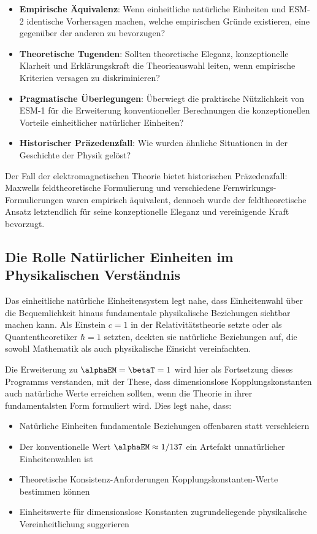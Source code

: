 	\begin{itemize}
		\item \textbf{Empirische Äquivalenz}: Wenn einheitliche natürliche Einheiten und ESM-2 identische Vorhersagen machen, welche empirischen Gründe existieren, eine gegenüber der anderen zu bevorzugen?
		\item \textbf{Theoretische Tugenden}: Sollten theoretische Eleganz, konzeptionelle Klarheit und Erklärungskraft die Theorieauswahl leiten, wenn empirische Kriterien versagen zu diskriminieren?
		\item \textbf{Pragmatische Überlegungen}: Überwiegt die praktische Nützlichkeit von ESM-1 für die Erweiterung konventioneller Berechnungen die konzeptionellen Vorteile einheitlicher natürlicher Einheiten?
		\item \textbf{Historischer Präzedenzfall}: Wie wurden ähnliche Situationen in der Geschichte der Physik gelöst?
	\end{itemize}
	
	Der Fall der elektromagnetischen Theorie bietet historischen Präzedenzfall: Maxwells feldtheoretische Formulierung und verschiedene Fernwirkungs-Formulierungen waren empirisch äquivalent, dennoch wurde der feldtheoretische Ansatz letztendlich für seine konzeptionelle Eleganz und vereinigende Kraft bevorzugt.
	
	\subsection{Die Rolle Natürlicher Einheiten im Physikalischen Verständnis}
	\label{subsec:natural_units_understanding}
	
	Das einheitliche natürliche Einheitensystem legt nahe, dass Einheitenwahl über die Bequemlichkeit hinaus fundamentale physikalische Beziehungen sichtbar machen kann. Als Einstein $c = 1$ in der Relativitätstheorie setzte oder als Quantentheoretiker $\hbar = 1$ setzten, deckten sie natürliche Beziehungen auf, die sowohl Mathematik als auch physikalische Einsicht vereinfachten.
	
	Die Erweiterung zu $\alphaEM = \betaT = 1$ wird hier als Fortsetzung dieses Programms verstanden, mit der These, dass dimensionslose Kopplungskonstanten auch natürliche Werte erreichen sollten, wenn die Theorie in ihrer fundamentalsten Form formuliert wird. Dies legt nahe, dass:
	
	\begin{itemize}
		\item Natürliche Einheiten fundamentale Beziehungen offenbaren statt verschleiern
		\item Der konventionelle Wert $\alphaEM \approx 1/137$ ein Artefakt unnatürlicher Einheitenwahlen ist
		\item Theoretische Konsistenz-Anforderungen Kopplungskonstanten-Werte bestimmen können
		\item Einheitswerte für dimensionslose Konstanten zugrundeliegende physikalische Vereinheitlichung suggerieren
	\end{itemize}
	
